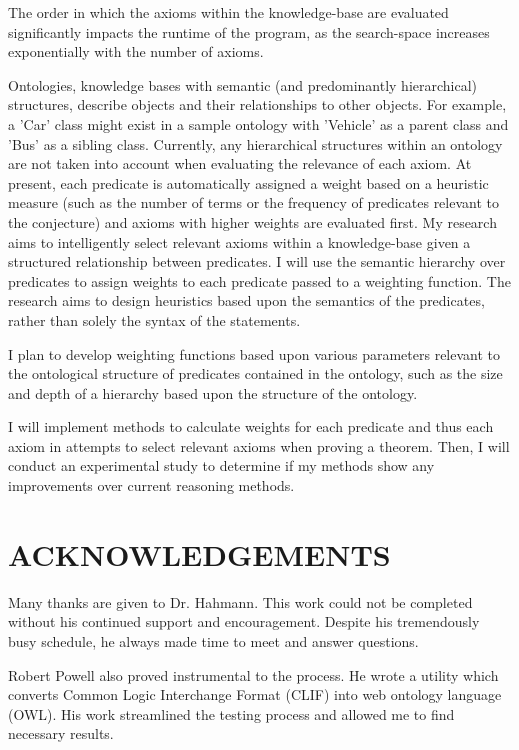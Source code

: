 \documentclass{article}
\begin{document}
The order in which the axioms within the knowledge-base are evaluated significantly impacts the runtime of the program, as the search-space increases exponentially with the number of axioms. 

Ontologies, knowledge bases with semantic (and predominantly hierarchical) structures, describe objects and their relationships to other objects. For example, a 'Car' class might exist in a sample ontology with 'Vehicle' as a parent class and 'Bus' as a sibling class. Currently, any hierarchical structures within an ontology are not taken into account when evaluating the relevance of each axiom. At present, each predicate is automatically assigned a weight based on a heuristic measure (such as the number of terms or the frequency of predicates relevant to the conjecture) and axioms with higher weights are evaluated first. My research aims to intelligently select relevant axioms within a knowledge-base given a structured relationship between predicates. I will use the semantic hierarchy over predicates to assign weights to each predicate passed to a weighting function. The research aims to design heuristics based upon the semantics of the predicates, rather than solely the syntax of the statements. 

I plan to develop weighting functions based upon various parameters relevant to the ontological structure of predicates contained in the ontology, such as the size and depth of a hierarchy based upon the structure of the ontology. 

I will implement methods to calculate weights for each predicate and thus each axiom in attempts to select relevant axioms when proving a theorem. Then, I will conduct an experimental study to determine if my methods show any improvements over current reasoning methods.
	
\setcounter{page}{3}
\newpage
{}
\vspace*{.05in}
\section*{\MakeUppercase{Acknowledgements}}
        
Many thanks are given to Dr. Hahmann. This work could not be completed without his continued support and encouragement. Despite his tremendously busy schedule, he always made time to meet and answer questions. 

Robert Powell also proved instrumental to the process. He wrote a utility which converts Common Logic Interchange Format (CLIF) into web ontology language (OWL). His work streamlined the testing process and allowed me to find necessary results. 
\end{document}

